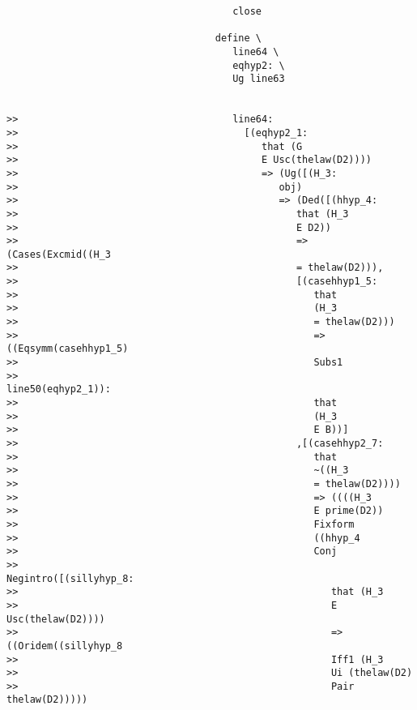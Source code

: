 \documentclass[12pt]{article}
\begin{document}
\begin{verbatim}
                                       close

                                    define \
                                       line64 \
                                       eqhyp2: \
                                       Ug line63


>>                                     line64:
>>                                       [(eqhyp2_1:
>>                                          that (G
>>                                          E Usc(thelaw(D2))))
>>                                          => (Ug([(H_3:
>>                                             obj)
>>                                             => (Ded([(hhyp_4:
>>                                                that (H_3
>>                                                E D2))
>>                                                => (Cases(Excmid((H_3
>>                                                = thelaw(D2))),
>>                                                [(casehhyp1_5:
>>                                                   that
>>                                                   (H_3
>>                                                   = thelaw(D2)))
>>                                                   => ((Eqsymm(casehhyp1_5)
>>                                                   Subs1
>>                                                   line50(eqhyp2_1)):
>>                                                   that
>>                                                   (H_3
>>                                                   E B))]
>>                                                ,[(casehhyp2_7:
>>                                                   that
>>                                                   ~((H_3
>>                                                   = thelaw(D2))))
>>                                                   => ((((H_3
>>                                                   E prime(D2))
>>                                                   Fixform
>>                                                   ((hhyp_4
>>                                                   Conj
>>                                                   Negintro([(sillyhyp_8:
>>                                                      that (H_3
>>                                                      E Usc(thelaw(D2))))
>>                                                      => ((Oridem((sillyhyp_8
>>                                                      Iff1 (H_3
>>                                                      Ui (thelaw(D2)
>>                                                      Pair thelaw(D2)))))

\end{verbatim}
\end{document}
